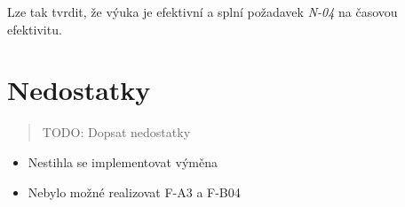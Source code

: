 Lze tak tvrdit, že výuka je efektivní a splní požadavek \emph{N-04} na
časovou efektivitu.

\section{Nedostatky}\label{nedostatky}

\begin{quote}
TODO: Dopsat nedostatky
\end{quote}

\begin{itemize}
\tightlist
\item
  Nestihla se implementovat výměna
\item
  Nebylo možné realizovat F-A3 a F-B04
\end{itemize}
